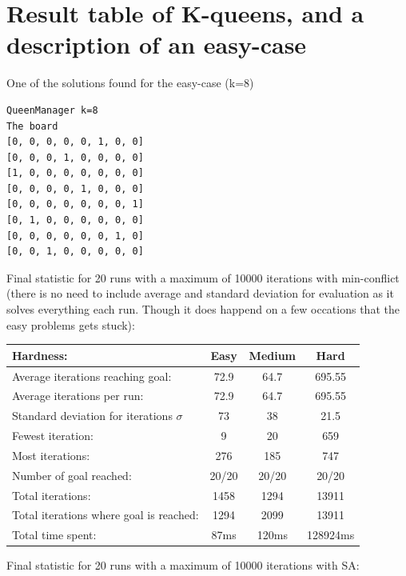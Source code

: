 \documentclass[12pt, a4paper]{article}
\begin{document}
\section{Result table of K-queens, and a description of an easy-case}
One of the solutions found for the easy-case (k=8)

\begin{verbatim}
QueenManager k=8
The board 
[0, 0, 0, 0, 0, 1, 0, 0]
[0, 0, 0, 1, 0, 0, 0, 0]
[1, 0, 0, 0, 0, 0, 0, 0]
[0, 0, 0, 0, 1, 0, 0, 0]
[0, 0, 0, 0, 0, 0, 0, 1]
[0, 1, 0, 0, 0, 0, 0, 0]
[0, 0, 0, 0, 0, 0, 1, 0]
[0, 0, 1, 0, 0, 0, 0, 0]

\end{verbatim}
\noindent
Final statistic for 20 runs with a maximum of 10000 iterations with min-conflict (there is no need to include average and standard deviation for evaluation as it solves everything each run. Though it does happend on a few occations that the easy problems gets stuck):\\
\begin{center}
  \begin{tabular}{| l | c c c|}
    \hline
    Hardness: &\textbf{Easy} & \textbf{Medium} & \textbf{Hard} \\ \hline
    Average iterations reaching goal: & 72.9& 64.7 & 695.55\\
    Average iterations per run:  & 72.9 & 64.7 & 695.55\\
    Standard deviation for iterations $\sigma$ & 73 & 38 & 21.5\\
    Fewest iteration: & 9 & 20& 659\\ 
    Most iterations: & 276 & 185& 747\\ 
    Number of goal reached: & 20/20 & 20/20 & 20/20\\
    Total iterations: & 1458 & 1294& 13911\\
    Total iterations where goal is reached: & 1294 & 2099& 13911\\
    Total time spent: & 87ms & 120ms & 128924ms\\
    \hline
  \end{tabular}
\end{center}
\noindent
Final statistic for 20 runs with a maximum of 10000 iterations with SA:\\
\end{document}
